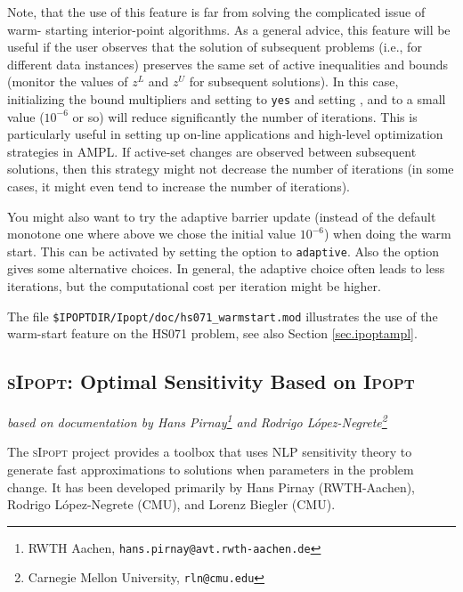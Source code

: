 \documentclass[10pt]{article}
\newcommand{\Ipopt}{\textsc{Ipopt}\xspace}
\newcommand{\sIpopt}{\textsc{sIpopt}\xspace}
\begin{document}
Note, that the use of this feature is far from solving the complicated issue of warm-
starting interior-point algorithms. As a general advice, this feature will be useful if the 
user observes that the solution of subsequent problems (i.e., for different data instances) 
preserves the same set of active inequalities and bounds (monitor the values of $z^L$ and 
$z^U$ for subsequent solutions). In this case, initializing the bound multipliers and 
setting  to {\tt yes} and 
setting ,
 and
 to a small value ($10^{-6}$ or so) will reduce 
significantly the number of iterations. This is particularly useful in setting up on-line 
applications and high-level optimization strategies in AMPL.
If active-set changes are observed between subsequent solutions, then this strategy might 
not decrease the number of iterations (in some cases, it might even tend to increase the 
number of iterations).

You might also want to try the adaptive barrier update (instead of the default monotone one where above we chose the initial value $10^{-6}$) when doing the warm start. This can be activated by setting the  option to {\tt adaptive}. Also the option  gives some alternative choices. In general, the adaptive choice often leads to less iterations, but the computational cost per iteration might be higher.

The file {\tt \$IPOPTDIR/Ipopt/doc/hs071\_warmstart.mod} illustrates the use of the warm-start feature on the HS071 problem, see also Section \ref{sec.ipoptampl}.

\subsection{\sIpopt: Optimal Sensitivity Based on \Ipopt}
\hfill \textit{based on documentation by Hans Pirnay\footnote{RWTH Aachen, {\tt hans.pirnay@avt.rwth-aachen.de}} and Rodrigo L\'opez-Negrete\footnote{Carnegie Mellon University, {\tt rln@cmu.edu}}}
\medskip

The \sIpopt project provides a toolbox that uses NLP sensitivity theory to generate fast approximations to solutions when parameters in the problem change. It has been developed primarily by Hans Pirnay (RWTH-Aachen), Rodrigo L\'opez-Negrete (CMU), and Lorenz Biegler (CMU).
\end{document}

